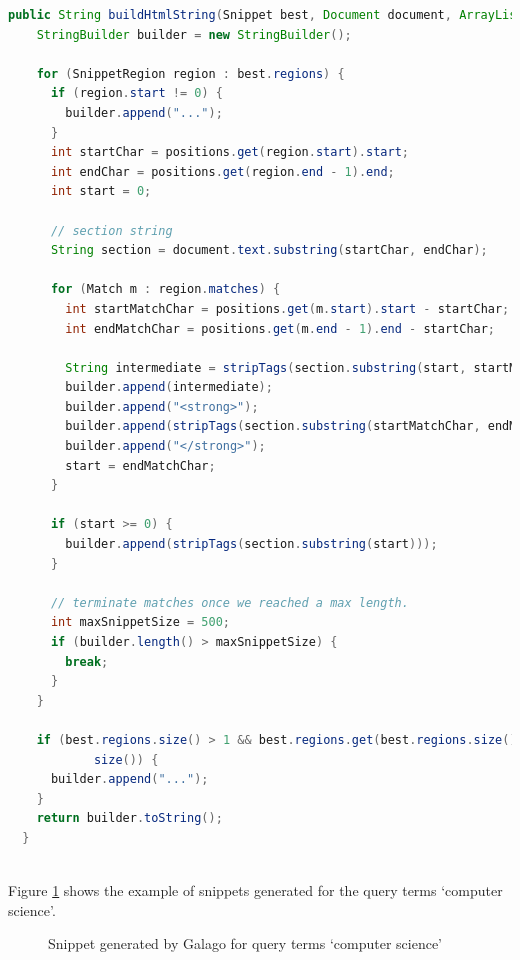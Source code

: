 \documentclass[letterpaper,11pt]{article}
\begin{document}
\begin{enumerate}
\begin{lstlisting}[language=Java, caption={}, label={lst:step5}]
 public String buildHtmlString(Snippet best, Document document, ArrayList<IntSpan> positions) {
    StringBuilder builder = new StringBuilder();

    for (SnippetRegion region : best.regions) {
      if (region.start != 0) {
        builder.append("...");
      }
      int startChar = positions.get(region.start).start;
      int endChar = positions.get(region.end - 1).end;
      int start = 0;

      // section string
      String section = document.text.substring(startChar, endChar);

      for (Match m : region.matches) {
        int startMatchChar = positions.get(m.start).start - startChar;
        int endMatchChar = positions.get(m.end - 1).end - startChar;

        String intermediate = stripTags(section.substring(start, startMatchChar));
        builder.append(intermediate);
        builder.append("<strong>");
        builder.append(stripTags(section.substring(startMatchChar, endMatchChar)));
        builder.append("</strong>");
        start = endMatchChar;
      }

      if (start >= 0) {
        builder.append(stripTags(section.substring(start)));
      }

      // terminate matches once we reached a max length.
      int maxSnippetSize = 500;
      if (builder.length() > maxSnippetSize) {
        break;
      }
    }

    if (best.regions.size() > 1 && best.regions.get(best.regions.size() - 1).end != document.terms.
            size()) {
      builder.append("...");
    }
    return builder.toString();
  }
  
\end{lstlisting}

\end{enumerate}

Figure \ref{fig:computer_science} shows the example of snippets generated for the query terms `computer science'. 

\begin{figure}[H]
	\centering
	\caption{Snippet generated by Galago for query terms `computer science'}
	\label{fig:computer_science}
\end{figure}
\end{document}
